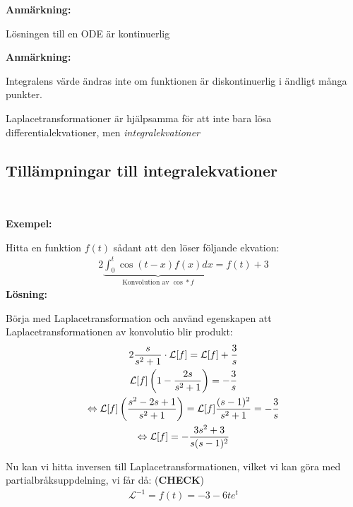 \par\bigskip
\noindent\textbf{Anmärkning:}\par
\noindent Lösningen till en ODE är kontinuerlig
\par\bigskip
\noindent\textbf{Anmärkning:}\par
\noindent Integralens värde ändras inte om funktionen är diskontinuerlig i ändligt många punkter. 
\par\bigskip
\noindent Laplacetransformationer är hjälpsamma för att inte bara lösa differentialekvationer, men \textit{integralekvationer}
\par\bigskip
\subsection{Tillämpningar till integralekvationer}\hfill\\\par
\noindent\textbf{Exempel:}\par
\noindent Hitta en funktion $f(t)$ sådant att den löser följande ekvation:
\begin{equation*}
  \begin{gathered}
    2\underbrace{\int_{0}^{t}\cos(t-x)f(x)dx}_{\text{Konvolution av $\cos*f$}} = f(t)+3
  \end{gathered}
\end{equation*}
\newpage
\noindent\textbf{Lösning:}\par
\noindent Börja med Laplacetransformation och använd egenskapen att Laplacetransformationen av konvolutio blir produkt:
\begin{equation*}
  \begin{gathered}
    2\dfrac{s}{s^2+1}\cdot\mathcal{L}[f] = \mathcal{L}[f]+\dfrac{3}{s}\\
    \mathcal{L}[f]\left(1-\dfrac{2s}{s^2+1}\right) = -\dfrac{3}{s}\\
    \Leftrightarrow \mathcal{L}[f]\left(\dfrac{s^2-2s+1}{s^2+1}\right) = \mathcal{L}[f]\dfrac{(s-1)^2}{s^2+1} = -\dfrac{3}{s}\\
    \Leftrightarrow\mathcal{L}[f] = -\dfrac{3s^2+3}{s(s-1)^2}
  \end{gathered}
\end{equation*}
\par\bigskip
\noindent Nu kan vi hitta inversen till Laplacetransformationen, vilket vi kan göra med partialbråksuppdelning, vi får då: (\textbf{CHECK})
\begin{equation*}
  \begin{gathered}
    \mathcal{L}^{-1} = f(t) = -3-6te^t
  \end{gathered}
\end{equation*}
